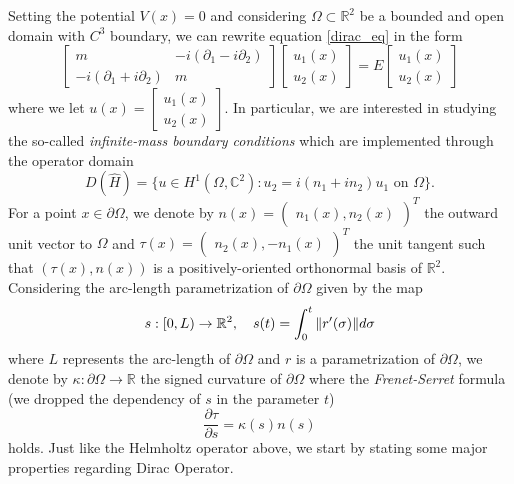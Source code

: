 Setting the potential \(V(x)=0\) and considering \(\Omega \subset \mathbb{R}^2\) be a bounded and open domain with \(C^3\) boundary, we can rewrite equation \eqref{dirac_eq} in the form    
\begin{equation}\label{dirac}
    \begin{bmatrix}
        m & -i(\partial_1 - i \partial_2)\\
        -i(\partial_1 + i \partial_2) & m
    \end{bmatrix}
    \begin{bmatrix}
        u_1(x)\\
        u_2(x)
    \end{bmatrix}
    =E
    \begin{bmatrix}
    u_1(x)\\
    u_2(x)
    \end{bmatrix}
\end{equation}
where we let \(u(x)=\begin{bmatrix}
    u_1(x)\\
    u_2(x)
    \end{bmatrix}\).
In particular, we are interested in studying the so-called \textit{infinite-mass boundary conditions} which are implemented through the operator domain
\[
D(\hat{H}) = \{u \in H^1(\Omega, \mathbb{C}^2): u_2 = i(n_1+i n_2)u_1 \text{ on } \Omega\}.
\]
For a point \(x \in \partial \Omega\), we denote by \(n(x) = \begin{pmatrix}
    n_1(x), n_2(x)
\end{pmatrix}^T\) the outward unit vector to \(\Omega\) and \(\tau(x) = \begin{pmatrix}
    n_2(x), -n_1(x)
\end{pmatrix}^T\) the unit tangent such that \((\tau(x), n(x))\) is a positively-oriented orthonormal basis of \(\mathbb{R}^2\). Considering the arc-length parametrization of \(\partial \Omega\) given by the map
\[
s: [0, L) \rightarrow \mathbb{R}^2, \quad s(t) = \int_0^t \norm{r'(\sigma)} d\sigma
\]
where \(L\) represents the arc-length of \(\partial \Omega\) and \(r\) is a parametrization of \(\partial\Omega\), we denote by \(\kappa:\partial\Omega \rightarrow \mathbb{R}\) the signed curvature of \(\partial\Omega\) where the \textit{Frenet-Serret} formula (we dropped the dependency of \(s\) in the parameter \(t\))
\[
    \frac{\partial\tau}{\partial s}=\kappa(s)n(s)
\]
holds. Just like the Helmholtz operator above, we start by stating some major properties regarding Dirac Operator.

